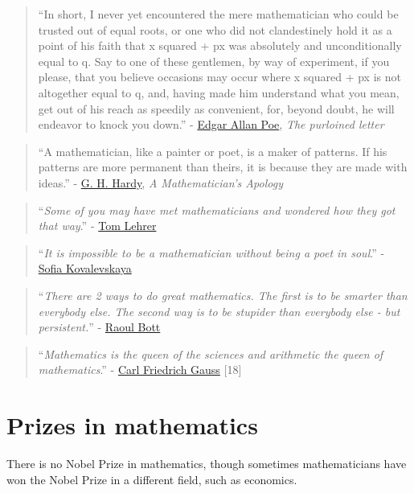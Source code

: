 \documentclass{book}
\numberwithin{equation}{section}
\begin{document}
\begin{quotation}
    ``In short, I never yet encountered the mere mathematician who could be trusted out of equal roots, or one who did not clandestinely hold it as a point of his faith that x squared + px was absolutely and unconditionally equal to q. Say to one of these gentlemen, by way of experiment, if you please, that you believe occasions may occur where x squared + px is not altogether equal to q, and, having made him understand what you mean, get out of his reach as speedily as convenient, for, beyond doubt, he will endeavor to knock you down.'' - \href{https://en.wikipedia.org/wiki/Edgar_Allan_Poe}{Edgar Allan Poe}, \textit{The purloined letter}
\end{quotation}

\begin{quotation}
    ``A mathematician, like a painter or poet, is a maker of patterns. If his patterns are more permanent than theirs, it is because they are made with ideas.'' - \href{https://en.wikipedia.org/wiki/G._H._Hardy}{G. H. Hardy}, \textit{A Mathematician's Apology}
\end{quotation}

\begin{quotation}
    ``\textit{Some of you may have met mathematicians and wondered how they got that way}.'' - \href{https://en.wikipedia.org/wiki/Tom_Lehrer}{Tom Lehrer}
\end{quotation}

\begin{quotation}
    ``\textit{It is impossible to be a mathematician without being a poet in soul}.'' - \href{https://en.wikipedia.org/wiki/Sofia_Kovalevskaya}{Sofia Kovalevskaya}
\end{quotation}

\begin{quotation}
    ``\textit{There are 2 ways to do great mathematics. The first is to be smarter than everybody else. The second way is to be stupider than everybody else - but persistent.}'' - \href{https://en.wikipedia.org/wiki/Raoul_Bott}{Raoul Bott}
\end{quotation}

\begin{quotation}
    ``\textit{Mathematics is the queen of the sciences and arithmetic the queen of mathematics}.'' - \href{https://en.wikipedia.org/wiki/Carl_Friedrich_Gauss}{Carl Friedrich Gauss} [18]
\end{quotation}

\section{Prizes in mathematics}
There is no Nobel Prize in mathematics, though sometimes mathematicians have won the Nobel Prize in a different field, such as economics.
\end{document}
